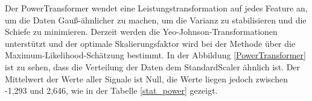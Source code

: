 \documentclass[12pt,a4paper]{scrartcl}
\numberwithin{equation}{section}
\begin{document}
 \begin{table}[ht!]
    \caption{Statistische Werte für jeden Sensor mit RobustScaler}
    \label{stat_robust}          
\end{table}

Der PowerTransformer wendet eine Leistungstransformation auf jedes Feature an, um die Daten Gauß-ähnlicher zu machen, um die Varianz zu stabilisieren und die Schiefe zu minimieren. Derzeit werden die Yeo-Johnson-Transformationen unterstützt und der optimale Skalierungsfaktor wird bei der Methode über die Maximum-Likelihood-Schätzung bestimmt. In der Abbildung \ref{PowerTransformer} ist zu sehen, dass die Verteilung der Daten dem StandardScaler ähnlich ist. Der Mittelwert der Werte aller Signale ist Null, die Werte liegen jedoch zwischen -1,293 und 2,646, wie in der Tabelle \ref{stat_power} gezeigt. 
\end{document}
